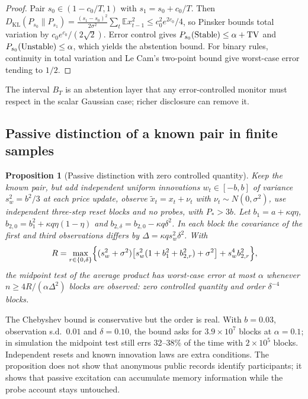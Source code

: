 \documentclass[12pt]{article}
\newtheorem{proposition}[theorem]{Proposition}
\theoremstyle{definition}
\theoremstyle{remark}
\newcommand{\E}{\mathbb{E}}
\newcommand{\KL}{D_{\mathrm{KL}}}
\begin{document}
\begin{proof}
Pair $s_0\in(1-c_0/T,1)$ with $s_1=s_0+c_0/T$. Then $\KL(P_{s_0}\|P_{s_1})=\frac{(s_1-s_0)^2}{2\sigma^2}\sum_t\E x_{t-1}^2\le c_0^2e^{2c_0}/4$, so Pinsker bounds total variation by $c_0e^{c_0}/(2\sqrt2)$. Error control gives $P_{s_0}({\rm Stable})\le\alpha+{\rm TV}$ and $P_{s_0}({\rm Unstable})\le\alpha$, which yields the abstention bound. For binary rules, continuity in total variation and Le Cam's two-point bound give worst-case error tending to $1/2$.
\end{proof}

The interval $B_T$ is an abstention layer that any error-controlled monitor must respect in the scalar Gaussian case; richer disclosure can remove it.

\subsection{Passive distinction of a known pair in finite samples}

\begin{proposition}[Passive distinction with zero controlled quantity]\label{prop:passive0}
Keep the known pair, but add independent uniform innovations $w_t\in[-b,b]$ of variance $s_w^2=b^2/3$ at each price update, observe $\tilde x_t=x_t+\nu_t$ with $\nu_t\sim N(0,\sigma^2)$, use independent three-step reset blocks and no probes, with $P_*>3b$. Let $b_1=a+\kappa q\eta$, $b_{2,0}=b_1^2+\kappa q\eta(1-\eta)$ and $b_{2,\delta}=b_{2,0}-\kappa q\delta^2$. In each block the covariance of the first and third observations differs by $\Delta=\kappa qs_w^2\delta^2$. With
\[
R=\max_{r\in\{0,\delta\}}\Bigl\{(s_w^2+\sigma^2)\bigl[s_w^2(1+b_1^2+b_{2,r}^2)+\sigma^2\bigr]+s_w^4b_{2,r}^2\Bigr\},
\]
the midpoint test of the average product has worst-case error at most $\alpha$ whenever $n\ge4R/(\alpha\Delta^2)$ blocks are observed: zero controlled quantity and order $\delta^{-4}$ blocks.
\end{proposition}

The Chebyshev bound is conservative but the order is real. With $b=0.03$, observation s.d.\ $0.01$ and $\delta=0.10$, the bound asks for $3.9\times10^7$ blocks at $\alpha=0.1$; in simulation the midpoint test still errs 32--38\% of the time with $2\times10^5$ blocks. Independent resets and known innovation laws are extra conditions. The proposition does not show that anonymous public records identify participants; it shows that passive excitation can accumulate memory information while the probe account stays untouched.
\end{document}

